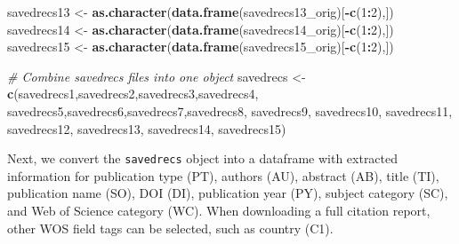 \documentclass[
]{article}
\newenvironment{Shaded}{\begin{snugshade}}{\end{snugshade}}
\newcommand{\CommentTok}[1]{\textcolor[rgb]{0.56,0.35,0.01}{\textit{#1}}}
\newcommand{\DecValTok}[1]{\textcolor[rgb]{0.00,0.00,0.81}{#1}}
\newcommand{\KeywordTok}[1]{\textcolor[rgb]{0.13,0.29,0.53}{\textbf{#1}}}
\newcommand{\NormalTok}[1]{#1}
\newcommand{\OperatorTok}[1]{\textcolor[rgb]{0.81,0.36,0.00}{\textbf{#1}}}
\newcommand{\StringTok}[1]{\textcolor[rgb]{0.31,0.60,0.02}{#1}}
\begin{document}
\begin{Shaded}
\begin{Highlighting}[]
\NormalTok{savedrecs13 <-}\StringTok{ }\KeywordTok{as.character}\NormalTok{(}\KeywordTok{data.frame}\NormalTok{(savedrecs13_orig)[}\OperatorTok{-}\KeywordTok{c}\NormalTok{(}\DecValTok{1}\OperatorTok{:}\DecValTok{2}\NormalTok{),])}
\NormalTok{savedrecs14 <-}\StringTok{ }\KeywordTok{as.character}\NormalTok{(}\KeywordTok{data.frame}\NormalTok{(savedrecs14_orig)[}\OperatorTok{-}\KeywordTok{c}\NormalTok{(}\DecValTok{1}\OperatorTok{:}\DecValTok{2}\NormalTok{),])}
\NormalTok{savedrecs15 <-}\StringTok{ }\KeywordTok{as.character}\NormalTok{(}\KeywordTok{data.frame}\NormalTok{(savedrecs15_orig)[}\OperatorTok{-}\KeywordTok{c}\NormalTok{(}\DecValTok{1}\OperatorTok{:}\DecValTok{2}\NormalTok{),])}


\CommentTok{# Combine savedrecs files into one object}
\NormalTok{savedrecs <-}\StringTok{ }\KeywordTok{c}\NormalTok{(savedrecs1,savedrecs2,savedrecs3,savedrecs4,}
\NormalTok{               savedrecs5,savedrecs6,savedrecs7,savedrecs8,}
\NormalTok{               savedrecs9, savedrecs10, savedrecs11, savedrecs12,}
\NormalTok{               savedrecs13, savedrecs14, savedrecs15)}
\end{Highlighting}
\end{Shaded}

Next, we convert the \texttt{savedrecs} object into a dataframe with
extracted information for publication type (PT), authors (AU), abstract
(AB), title (TI), publication name (SO), DOI (DI), publication year
(PY), subject category (SC), and Web of Science category (WC). When
downloading a full citation report, other WOS field tags can be
selected, such as country (C1).
\end{document}
